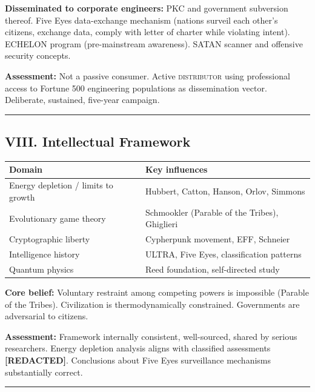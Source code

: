 \textbf{Disseminated to corporate engineers:} PKC and government subversion thereof. Five Eyes data-exchange mechanism (nations surveil each other's citizens, exchange data, comply with letter of charter while violating intent). ECHELON program (pre-mainstream awareness). SATAN scanner and offensive security concepts.

\textbf{Assessment:} Not a passive consumer. Active \textsc{distributor} using professional access to Fortune 500 engineering populations as dissemination vector. Deliberate, sustained, five-year campaign.

\vspace{1cm}\hrule\vspace{1cm}

\subsection*{VIII. Intellectual Framework}
\label{interlude:intellectual-framework}

{%
\small
\begin{tabular}{p{4.5cm} p{9cm}}
\hline
\textbf{Domain} & \textbf{Key influences} \\
\hline
Energy depletion / limits to growth & Hubbert, Catton, Hanson, Orlov, Simmons \\
Evolutionary game theory & Schmookler (Parable of the Tribes), Ghiglieri \\
Cryptographic liberty & Cypherpunk movement, EFF, Schneier \\
Intelligence history & ULTRA, Five Eyes, classification patterns \\
Quantum physics & Reed foundation, self-directed study \\
\hline
\end{tabular}
}%

\medskip

\textbf{Core belief:} Voluntary restraint among competing powers is impossible (Parable of the Tribes). Civilization is thermodynamically constrained. Governments are adversarial to citizens.

\textbf{Assessment:} Framework internally consistent, well-sourced, shared by serious researchers. Energy depletion analysis aligns with classified assessments \textbf{[REDACTED]}. Conclusions about Five Eyes surveillance mechanisms substantially correct.

\vspace{1cm}\hrule\vspace{1cm}

